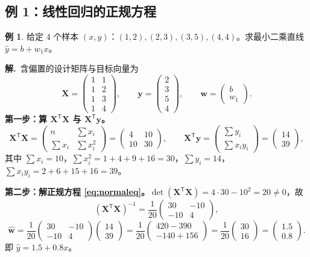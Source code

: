 \documentclass[UTF8,a4paper,11pt]{ctexart}
\theoremstyle{definition}
\newtheorem{example}[definition]{例}
\theoremstyle{plain}
\theoremstyle{remark}
\newcommand{\T}{^{\mathsf{T}}}
\begin{document}
\subsection{例 1：线性回归的正规方程}

\begin{example}\label{ex:ols}
给定 $4$ 个样本 $(x,y)$：$(1,2),(2,3),(3,5),(4,4)$。求最小二乘直线 $\hat y=b+w_1x$。
\end{example}

\noindent\textbf{解.}\ 含偏置的设计矩阵与目标向量为
\[
  \bm{X}=\begin{pmatrix}1&1\\1&2\\1&3\\1&4\end{pmatrix},\qquad
  \bm{y}=\begin{pmatrix}2\\3\\5\\4\end{pmatrix},\qquad
  \bm{w}=\begin{pmatrix}b\\w_1\end{pmatrix}.
\]
\textbf{第一步：算 $\bm{X}\T\bm{X}$ 与 $\bm{X}\T\bm{y}$。}
\[
  \bm{X}\T\bm{X}=\begin{pmatrix}n&\sum x_i\\ \sum x_i&\sum x_i^2\end{pmatrix}
  =\begin{pmatrix}4&10\\10&30\end{pmatrix},
  \qquad
  \bm{X}\T\bm{y}=\begin{pmatrix}\sum y_i\\ \sum x_iy_i\end{pmatrix}
  =\begin{pmatrix}14\\39\end{pmatrix},
\]
其中 $\sum x_i=10$，$\sum x_i^2=1+4+9+16=30$，$\sum y_i=14$，$\sum x_iy_i=2+6+15+16=39$。

\textbf{第二步：解正规方程 \eqref{eq:normaleq}。}$\det(\bm{X}\T\bm{X})=4\cdot30-10^2=20\ne0$，故
\[
  (\bm{X}\T\bm{X})^{-1}=\frac{1}{20}\begin{pmatrix}30&-10\\-10&4\end{pmatrix},
\]
\[
  \hat{\bm{w}}=\frac{1}{20}\begin{pmatrix}30&-10\\-10&4\end{pmatrix}\begin{pmatrix}14\\39\end{pmatrix}
  =\frac{1}{20}\begin{pmatrix}420-390\\-140+156\end{pmatrix}
  =\frac{1}{20}\begin{pmatrix}30\\16\end{pmatrix}
  =\begin{pmatrix}1.5\\0.8\end{pmatrix}.
\]
即 $\hat y=1.5+0.8x$。
\end{document}
